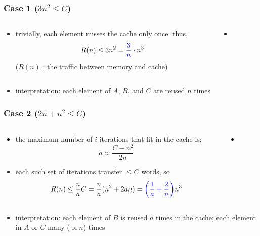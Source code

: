 \documentclass[12pt,dvipdfmx]{beamer}
\newcommand{\ao}[1]{{\color{blue}#1}}
\begin{document}
\begin{frame}[fragile]
\frametitle{Case 1 ($3n^2 \leq C$)}
\begin{columns}
  \begin{column}{0.5\textwidth}
\begin{itemize}
\item trivially, each element misses the cache only once. thus,
  \[ R(n) \leq 3n^2 = \ao{\frac{3}{n}} \cdot n^3 \]
($R(n)$ : the traffic between memory and cache)
\end{itemize}
\end{column}

\begin{column}{0.5\textwidth}
  \begin{itemize}
  \item []
{\tiny\def\svgwidth{0.9\textwidth}
}
\end{itemize}
\end{column}
\end{columns}

\begin{itemize}
\item [] 
\ao{interpretation:} each element of $A$, $B$, and $C$ are reused $n$ times
\end{itemize}
\end{frame}


\begin{frame}[fragile]
\frametitle{Case 2 ($2n + n^2 \leq C$)}
\begin{columns}
  \begin{column}{0.5\textwidth}
\begin{itemize}
\item the maximum number of $i$-iterations
  that fit in the cache is:
\[ a \approx \frac{C - n^2}{2n} \]
\item each such set of iterations transfer $\leq C$ words, so
\[ R(n) \leq \frac{n}{a} C 
= \frac{n}{a} (n^2 + 2an)
= \ao{\left(\frac{1}{a}+\frac{2}{n}\right)} n^3
\]
\end{itemize}
\end{column}

\begin{column}{0.5\textwidth}
  \begin{itemize}
  \item []
{\tiny\def\svgwidth{0.9\textwidth}
}
\end{itemize}
\end{column}
\end{columns}

\begin{itemize}
\item []
\ao{interpretation:} each element of $B$ is reused $a$ times in the cache;
each element in $A$ or $C$ many ($\propto n$) times 
\end{itemize}
\end{frame}
\end{document}
